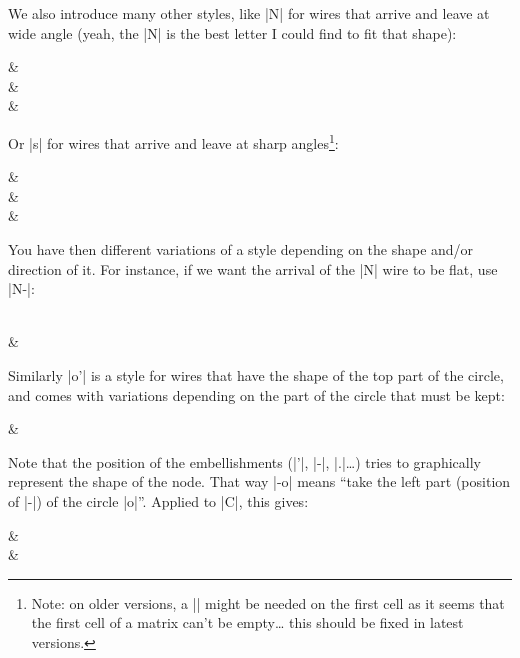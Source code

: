 \documentclass[a4paper,doc2]{ltxdoc} %
\begin{document}
We also introduce many other styles, like |N| for wires that arrive and leave at wide angle (yeah, the |N| is the best letter I could find to fit that shape):
\begin{codeexample}[]
\begin{ZX}
  \zxN{}                           & \zxZ{\beta}\\
  \zxZ{\alpha} \ar[ru,N] \ar[rd,N] &\\
                                   & \zxZ{\gamma}
\end{ZX}
\end{codeexample}
Or |s| for wires that arrive and leave at sharp angles\footnote{Note: on older versions, a |\zxN{}| might be needed on the first cell as it seems that the first cell of a matrix can't be empty… this should be fixed in latest versions.}:
\begin{codeexample}[]
\begin{ZX}
                                   & \zxZ{\beta} \\
  \zxZ{\alpha} \ar[ru,s] \ar[rd,s] &             \\
                                   & \zxZ{\gamma}
\end{ZX}
\end{codeexample}
You have then different variations of a style depending on the shape and/or direction of it. For instance, if we want the arrival of the |N| wire to be flat, use |N-|:
\begin{codeexample}[]
\begin{ZX}
  \zxZ{\alpha} \ar[rd,N-] \\
                         & \zxZ{\beta}
\end{ZX}
\end{codeexample}
Similarly |o'| is a style for wires that have the shape of the top part of the circle, and comes with variations depending on the part of the circle that must be kept:
\begin{codeexample}[width=0pt]
\begin{ZX}
  \zxZ{\alpha} \ar[r,o',green] \ar[r,o.,red] \ar[d,o-,blue] \ar[d,-o,purple] & \zxZ{\beta}\\
  \zxZ{\beta}
\end{ZX}
\end{codeexample}
Note that the position of the embellishments (|'|, |-|, |.|\dots{}) tries to graphically represent the shape of the node. That way |-o| means ``take the left part (position of |-|) of the circle |o|''. Applied to |C|, this gives:
\begin{codeexample}[]
\begin{ZX}
  \zxX{} \ar[d,C] \ar[r,C']  & \zxZ{} \ar[d,C-]\\
  \zxZ{} \ar[r,C.]           & \zxX{}
\end{ZX}
\end{codeexample}
\end{document}
